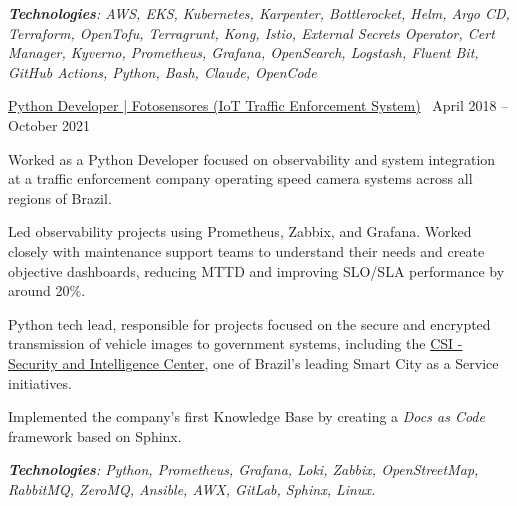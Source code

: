 \documentclass[10pt,a4paper]{altacv}
\begin{document}
\textit{\textbf{Technologies}: AWS, EKS, Kubernetes, Karpenter, Bottlerocket, Helm, Argo CD, Terraform, OpenTofu, Terragrunt, Kong, Istio, External Secrets Operator, Cert Manager, Kyverno, Prometheus, Grafana, OpenSearch, Logstash, Fluent Bit, GitHub Actions, Python, Bash, Claude, OpenCode}

\medskip

\divider

{\large \href{https://fotosensores.com/}{Python Developer | Fotosensores (IoT Traffic Enforcement System)}} \hfill \faCalendar \ April 2018 -- October 2021

\bigskip
\bigskip

Worked as a Python Developer focused on observability and system integration at a traffic enforcement company operating speed camera systems across all regions of Brazil.

\medskip

Led observability projects using Prometheus, Zabbix, and Grafana. Worked closely with maintenance support teams to understand their needs and create objective dashboards, reducing MTTD and improving SLO/SLA performance by around 20\%.

\medskip

Python tech lead, responsible for projects focused on the secure and encrypted transmission of vehicle images to government systems, including the \href{https://www.sjc.sp.gov.br/servicos/protecao-ao-cidadao/csi/}{CSI - Security and Intelligence Center}, one of Brazil's leading Smart City as a Service initiatives.

\medskip

Implemented the company's first Knowledge Base by creating a \textit{Docs as Code} framework based on Sphinx.

\medskip

\textit{\textbf{Technologies}: Python, Prometheus, Grafana, Loki, Zabbix, OpenStreetMap, RabbitMQ, ZeroMQ, Ansible, AWX, GitLab, Sphinx, Linux.}

\bigskip
\bigskip

\end{document}
